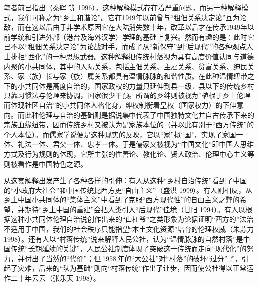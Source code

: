 \documentclass[a4paper,12pt,punct=kaiming]{ctexart}
\begin{document}
笔者前已指出（秦晖 等 1996），这种解释模式存在着严重问题，而另一种解释模式，我们可称之为“乡土和谐论”。它在1949年以前曾与“租佃关系决定论”互为论敌，而在这以后由于非学术原因它在大陆消失数十年，改革以后才在传承1949年以前学统和引进外部（港台及海外汉学）学理的基础上复兴。然而有趣的是：此时它已不以“租佃关系决定论”为论战对手，而成了从“新保守”到“后现代”的各种观点人士排拒“西化”的一种思想武器。这种解释把传统村落视为具有高度价值认同与道德内聚的小共同体，其中的人际关系，包括主佃关系、主雇关系、贫富关系、绅民关系、家（族）长与家（族）属关系都具有温情脉脉的和谐性质。在此种温情纽带之下的小共同体是高度自治的，国家政权的力量只延伸到县一级，县以下的传统乡村只靠习惯法与伦理来协调，国家很少干预。所谓的乡绅则被视为“植根于乡土伦理而体现社区自治”的小共同体人格化身，绅权制衡着皇权（国家权力）的下伸意向。而此种伦理与自治的基础则是据说集中代表了中国独特文化并自古传承下来的宗族血缘纽带，因而传统乡村又被认为是家族本位的（并以此有别于“西方传统”的个人本位）。而儒家学说便是这种现实的反映，它以“家”拟“国”，实现了家国一体、礼法一体、君父一体、忠孝一体。于是儒家又被视为“中国文化”即中国人思维方式及行为规则的体现，它所主张的性善论、教化论、贤人政治、伦理中心主义等则被看作是中国特色之源。

从这套解释出发产生了各种各样的引伸：有人从这种“乡村自治传统”看到了中国的“小政府大社会”和中国传统比西方更“自由主义”（盛洪 1999）。有人则相反，从乡土中国小共同体的“集体主义”中看到了克服“西方现代性”的自由主义之弊的希望，并期待“乡土中国的重建”会把人类引入“后现代”佳境（甘阳 1994）。有人以根据这种小共同体伦理自治说创作出来的“山杠爷”之类形象为论据证明“西方的”法治不适用于中国，我们的社会秩序只能指望“本土文化资源”培育的伦理权威（朱苏力 1998）。还有人以“村落传统”说来解释人民公社，认为“温情脉脉的自然村落”是中国传统“长期延续的关键”，人民公社制度体现了突破这一传统而走向“现代化”的努力，并付出了当然的“代价”；但 1958 年的“大公社”对“村落”的破坏“过分”了，引起了灾难，后来的“队为基础”则向“村落传统”作出了让步，因而使公社得以正常运作二十年云云（张乐天 1998）。
\end{document}
